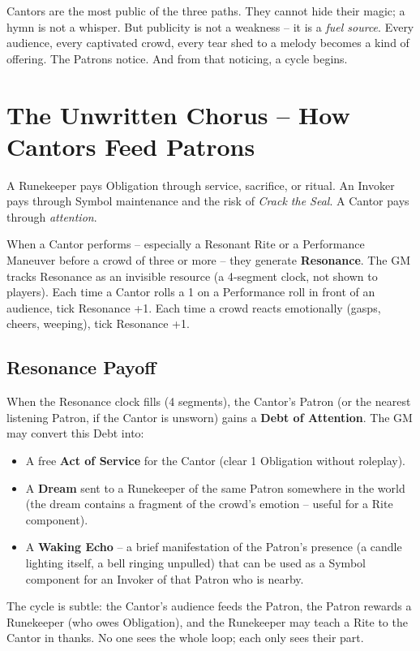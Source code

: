 \documentclass[10pt,a5paper]{book}
\begin{document}
Cantors are the most public of the three paths. They cannot hide their magic; a hymn is not a whisper. But publicity is not a weakness – it is a \textit{fuel source}. Every audience, every captivated crowd, every tear shed to a melody becomes a kind of offering. The Patrons notice. And from that noticing, a cycle begins.

\section{The Unwritten Chorus – How Cantors Feed Patrons}

A Runekeeper pays Obligation through service, sacrifice, or ritual. An Invoker pays through Symbol maintenance and the risk of \textit{Crack the Seal}. A Cantor pays through \textit{attention}.

When a Cantor performs – especially a Resonant Rite or a Performance Maneuver before a crowd of three or more – they generate \textbf{Resonance}. The GM tracks Resonance as an invisible resource (a 4‑segment clock, not shown to players). Each time a Cantor rolls a 1 on a Performance roll in front of an audience, tick Resonance +1. Each time a crowd reacts emotionally (gasps, cheers, weeping), tick Resonance +1.

\subsection*{Resonance Payoff}

When the Resonance clock fills (4 segments), the Cantor’s Patron (or the nearest listening Patron, if the Cantor is unsworn) gains a \textbf{Debt of Attention}. The GM may convert this Debt into:

\begin{itemize}
    \item A free \textbf{Act of Service} for the Cantor (clear 1 Obligation without roleplay).
    \item A \textbf{Dream} sent to a Runekeeper of the same Patron somewhere in the world (the dream contains a fragment of the crowd’s emotion – useful for a Rite component).
    \item A \textbf{Waking Echo} – a brief manifestation of the Patron’s presence (a candle lighting itself, a bell ringing unpulled) that can be used as a Symbol component for an Invoker of that Patron who is nearby.
\end{itemize}

The cycle is subtle: the Cantor’s audience feeds the Patron, the Patron rewards a Runekeeper (who owes Obligation), and the Runekeeper may teach a Rite to the Cantor in thanks. No one sees the whole loop; each only sees their part.
\end{document}
